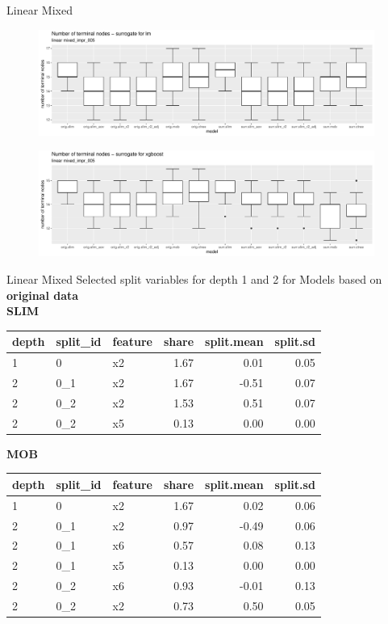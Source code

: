 \documentclass[9pt, xcolor=table]{beamer}
\begin{document}
\begin{frame}{Linear Mixed}
\begin{figure}
    \includegraphics[width=11cm]{Figures/Stability/linear_mixed_impr_005/lm_nofnodes.pdf}
\end{figure}   

\begin{figure}
    \includegraphics[width=11cm]{Figures/Stability/linear_mixed_impr_005/xgboost_nofnodes.pdf}
\end{figure}  

\end{frame}

\begin{frame}{Linear Mixed}
Selected split variables for depth 1 and 2 for Models based on \textbf{original data}\\
\textbf{SLIM}

\begin{table}[ht]
\centering
\begin{tabular}{lllrrr}
  \hline
depth & split\_id & feature & share & split.mean & split.sd \\ 
  \hline
1 & 0 & x2 & 1.67 & 0.01 & 0.05 \\ 
  2 & 0\_1 & x2 & 1.67 & -0.51 & 0.07 \\ 
  2 & 0\_2 & x2 & 1.53 & 0.51 & 0.07 \\ 
  2 & 0\_2 & x5 & 0.13 & 0.00 & 0.00 \\ 
   \hline
\end{tabular}
\end{table}

\textbf{MOB}
\begin{table}[ht]
\centering
\begin{tabular}{lllrrr}
  \hline
depth & split\_id & feature & share & split.mean & split.sd \\ 
  \hline
1 & 0 & x2 & 1.67 & 0.02 & 0.06 \\ 
  2 & 0\_1 & x2 & 0.97 & -0.49 & 0.06 \\ 
  2 & 0\_1 & x6 & 0.57 & 0.08 & 0.13 \\ 
  2 & 0\_1 & x5 & 0.13 & 0.00 & 0.00 \\ 
  2 & 0\_2 & x6 & 0.93 & -0.01 & 0.13 \\ 
  2 & 0\_2 & x2 & 0.73 & 0.50 & 0.05 \\ 
   \hline
\end{tabular}
\end{table}

\end{frame}
\end{document}
